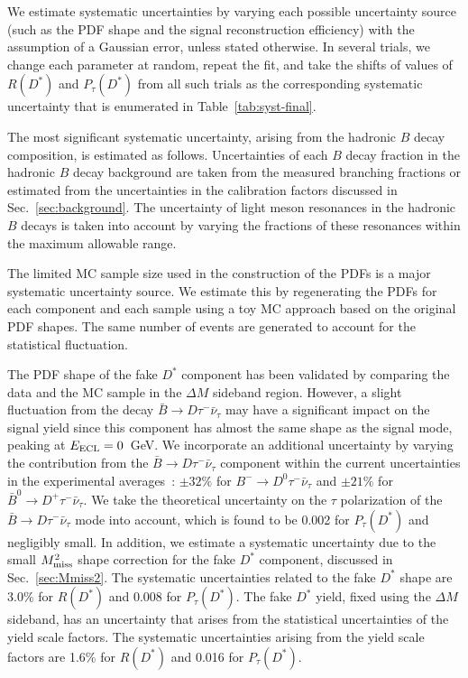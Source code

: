 \documentclass[aps,prd,twocolumn,superscriptaddress,showpacs,preprintnumbers,amsmath,amssymb]{revtex4-1}
\begin{document}
We estimate systematic uncertainties by varying each possible uncertainty source (such as the PDF shape and the signal reconstruction efficiency) with the assumption of a Gaussian error, unless stated otherwise. In several trials, we change each parameter at random, repeat the fit, and take the shifts of values of $R(D^*)$ and $P_\tau(D^*)$ from all such trials as the corresponding systematic uncertainty that is enumerated in Table~\ref{tab:syst-final}.

The most significant systematic uncertainty, arising from the hadronic $B$ decay composition, is estimated as follows. Uncertainties of each $B$ decay fraction in the hadronic $B$ decay background are taken from the measured branching fractions or estimated from the uncertainties in the calibration factors discussed in Sec.~\ref{sec:background}. The uncertainty of light meson resonances in the hadronic $B$ decays is taken into account by varying the fractions of these resonances within the maximum allowable range.

The limited MC sample size used in the construction of the PDFs is a major systematic uncertainty source. We estimate this by regenerating the PDFs for each component and each sample using a toy MC approach based on the original PDF shapes. The same number of events are generated to account for the statistical fluctuation.

The PDF shape of the fake $D^*$ component has been validated by comparing the data and the MC sample in the $\Delta M$ sideband region. However, a slight fluctuation from the decay ${\bar B} \rightarrow D \tau^- {\bar \nu}_\tau$ may have a significant impact on the signal yield since this component has almost the same shape as the signal mode, peaking at $E_{\rm ECL} = 0$~GeV. We incorporate an additional uncertainty by varying the contribution from the ${\bar B} \rightarrow D \tau^- {\bar \nu}_\tau$ component within the current uncertainties in the experimental averages~\cite{cite:PDG:2016}: $\pm 32\%$ for $B^- \rightarrow D^0 \tau^- {\bar \nu_{\tau}}$ and $\pm 21\%$ for ${\bar B^0} \rightarrow D^+ \tau^- {\bar \nu_{\tau}}$. We take the theoretical uncertainty on the $\tau$ polarization of the ${\bar B} \rightarrow D \tau^- {\bar \nu}_\tau$ mode into account, which is found to be 0.002 for $P_\tau(D^*)$ and negligibly small. In addition, we estimate a systematic uncertainty due to the small $M_{\rm miss}^2$ shape correction for the fake $D^*$ component, discussed in Sec.~\ref{sec:Mmiss2}. The systematic uncertainties related to the fake $D^*$ shape are 3.0\% for $R(D^*)$ and 0.008 for $P_\tau(D^*)$. The fake $D^*$ yield, fixed using the $\Delta M$ sideband, has an uncertainty that arises from the statistical uncertainties of the yield scale factors. The systematic uncertainties arising from the yield scale factors are 1.6\% for $R(D^*)$ and 0.016 for $P_\tau(D^*)$.
\end{document}
